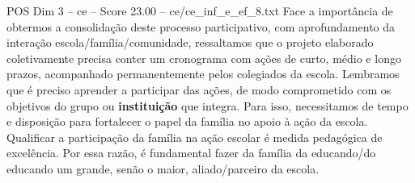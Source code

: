 \begin{textsample}{POS Dim 3 – ce – Score 23.00 – ce/ce\_inf\_e\_ef\_8.txt}
Face a importância de obtermos a consolidação deste processo participativo, com aprofundamento da interação escola/família/comunidade, ressaltamos que o projeto elaborado coletivamente precisa conter um cronograma com ações de curto, médio e longo prazos, acompanhado permanentemente pelos colegiados da escola.
Lembramos que é preciso aprender a participar das ações, de modo comprometido com os objetivos do grupo ou \textbf{instituição} que integra.
Para isso, necessitamos de tempo e disposição para fortalecer o papel da família no apoio à ação da escola.
Qualificar a participação da família na ação escolar é medida pedagógica de excelência.
Por essa razão, é fundamental fazer da família da educando/do educando um grande, senão o maior, aliado/parceiro da escola.

\end{textsample}
